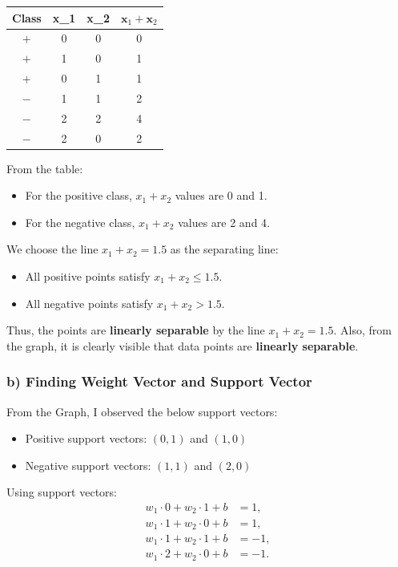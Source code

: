 \documentclass{article}
\begin{document}
\begin{center}
\begin{tabular}{|c|c|c|c|}
    \hline
    \textbf{Class} & \textbf{x}_1 & \textbf{x}_2 & $\textbf{x}_1 + \textbf{x}_2$ \\
    \hline
    $+$ & 0 & 0 & 0 \\ \hline
    $+$ & 1 & 0 & 1 \\ \hline
    $+$ & 0 & 1 & 1 \\ \hline
    $-$ & 1 & 1 & 2 \\ \hline
    $-$ & 2 & 2 & 4 \\ \hline
    $-$ & 2 & 0 & 2 \\ \hline
\end{tabular}
\end{center}

From the table:
\begin{itemize}
    \item For the positive class, $x_1 + x_2$ values are 0 and 1.
    \item For the negative class, $x_1 + x_2$ values are 2 and 4.
\end{itemize}

We choose the line $x_1 + x_2 = 1.5$ as the separating line:
\begin{itemize}
    \item All positive points satisfy $x_1 + x_2 \leq 1.5$.
    \item All negative points satisfy $x_1 + x_2 > 1.5$.
\end{itemize}

\vspace{5pt}
Thus, the points are \textbf{linearly separable} by the line $x_1 + x_2 = 1.5$. Also, from the graph, it is clearly visible that data points are \textbf{linearly separable}.


\subsubsection*{b) Finding Weight Vector and Support Vector}

From the Graph, I observed the below support vectors:
\begin{itemize}
    \item Positive support vectors: $(0, 1)$ and $(1, 0)$
    \item Negative support vectors: $(1, 1)$ and $(2, 0)$
\end{itemize}

Using support vectors:
\begin{align}
    w_1 \cdot 0 + w_2 \cdot 1 + b &= 1, \\
    w_1 \cdot 1 + w_2 \cdot 0 + b &= 1, \\
    w_1 \cdot 1 + w_2 \cdot 1 + b &= -1, \\
    w_1 \cdot 2 + w_2 \cdot 0 + b &= -1.
\end{align}
\end{document}
